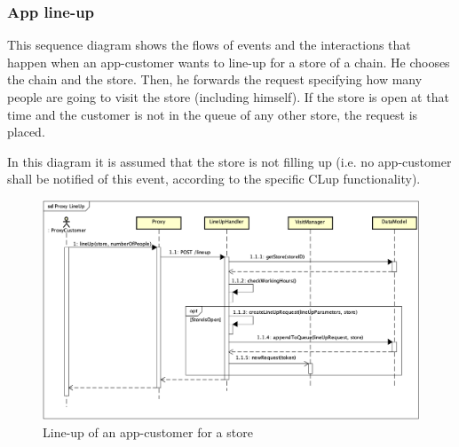 \documentclass[a4paper,oneside,11pt]{book}
\begin{document}
    \subsubsection{App line-up}
    This sequence diagram shows the flows of events and the interactions that happen when an app-customer wants to line-up for a store of a chain. He chooses the chain and the store. Then, he forwards the request specifying how many people are going to visit the store (including himself). If the store is open at that time and the customer is not in the queue of any other store, the request is placed. \par
    In this diagram it is assumed that the store is not filling up (i.e. no app-customer shall be notified of this event, according to the specific CLup functionality).
    \begin{figure}[H]
        \centering
        \includegraphics[width=\textwidth, height=\textheight, keepaspectratio]{pictures/sequence_diagrams/proxy_lineup}
        \caption{Line-up of an app-customer for a store}
        \label{figure:proxy_lineup}
    \end{figure}
    \newpage
\end{document}
